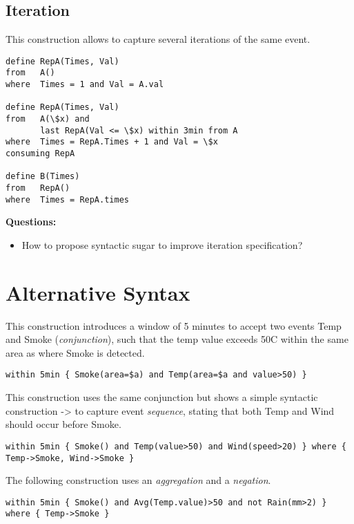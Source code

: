 \subsection{Iteration}
\label{sec:Iteration}

This construction allows to capture several iterations of the same event.

\begin{lstlisting}[language=iotdsl]
define RepA(Times, Val)
from   A()
where  Times = 1 and Val = A.val

define RepA(Times, Val)
from   A(\$x) and 
       last RepA(Val <= \$x) within 3min from A
where  Times = RepA.Times + 1 and Val = \$x
consuming RepA

define B(Times)
from   RepA()
where  Times = RepA.times
\end{lstlisting}

\medskip
\noindent
\textbf{Questions:}
\begin{itemize}
	\item How to propose syntactic sugar to improve iteration specification?
\end{itemize}

\section{Alternative Syntax \cite{Margara-Cugola-Tamburrelli:2014}}
\label{sec:AlternativeSyntax}

This construction introduces a window of 5 minutes to accept two events \textsf{Temp} and \textsf{Smoke} (\emph{conjunction}), such that the temp value exceeds 50\textdegree C within the same area as where \textsf{Smoke} is detected.

\begin{lstlisting}[language=iotdsl]
within 5min { Smoke(area=$a) and Temp(area=$a and value>50) }
\end{lstlisting}

This construction uses the same conjunction but shows a simple syntactic construction \textsf{->} to capture event \emph{sequence}, stating that both \textsf{Temp} and \textsf{Wind} should occur before \textsf{Smoke}.

\begin{lstlisting}[language=iotdsl]
within 5min { Smoke() and Temp(value>50) and Wind(speed>20) } where { Temp->Smoke, Wind->Smoke }
\end{lstlisting}

The following construction uses an \emph{aggregation} and a \emph{negation}.

\begin{lstlisting}[language=iotdsl]
within 5min { Smoke() and Avg(Temp.value)>50 and not Rain(mm>2) } where { Temp->Smoke }
\end{lstlisting}

